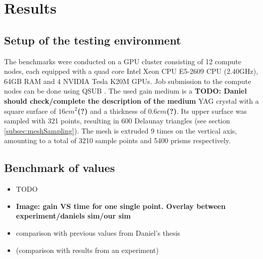 \section{Results}

\subsection{Setup of the testing environment}

The benchmarks were conducted on a GPU cluster consisting of 12 compute nodes,
each equipped with a quad core Intel Xeon CPU E5-2609 CPU (2.40GHz), 64GB RAM
and 4 NVIDIA Tesla K20M GPUs. Job submission to the compute nodes can be done
using QSUB \cite{qsub}. The used gain medium is a \textbf{TODO: Daniel should
check/complete the description of the medium} YAG crystal with a square surface
of $16cm^2$\textbf{(?)} and a thickness of $0.6cm$\textbf{(?)}. Its upper
surface was sampled with 321 points, resulting in 600 Delaunay triangles (see
section \ref{subsec:meshSampling}). The mesh is extruded 9 times on the vertical
axis, amounting to a total of 3210 sample points and 5400 prisms respectively.



\subsection{Benchmark of values}

\begin{itemize}

  \item TODO

  \item \textbf{Image: gain VS time for one single point. Overlay between
    experiment/daniels sim/our sim}

  \item comparison with previous values from Daniel's thesis

  \item (comparison with results from an experiment)

\end{itemize}



